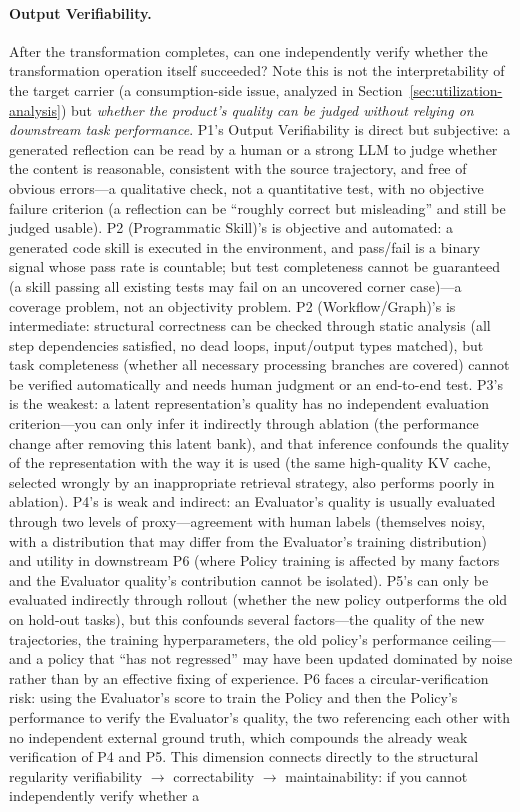 \paragraph{Output Verifiability.} After the transformation completes, can one independently verify whether the transformation operation itself succeeded? Note this is not the interpretability of the target carrier (a consumption-side issue, analyzed in Section~\ref{sec:utilization-analysis}) but \emph{whether the product's quality can be judged without relying on downstream task performance}. P1's Output Verifiability is direct but subjective: a generated reflection can be read by a human or a strong LLM to judge whether the content is reasonable, consistent with the source trajectory, and free of obvious errors---a qualitative check, not a quantitative test, with no objective failure criterion (a reflection can be ``roughly correct but misleading'' and still be judged usable). P2 (Programmatic Skill)'s is objective and automated: a generated code skill is executed in the environment, and pass/fail is a binary signal whose pass rate is countable; but test completeness cannot be guaranteed (a skill passing all existing tests may fail on an uncovered corner case)---a coverage problem, not an objectivity problem. P2 (Workflow/Graph)'s is intermediate: structural correctness can be checked through static analysis (all step dependencies satisfied, no dead loops, input/output types matched), but task completeness (whether all necessary processing branches are covered) cannot be verified automatically and needs human judgment or an end-to-end test. P3's is the weakest: a latent representation's quality has no independent evaluation criterion---you can only infer it indirectly through ablation (the performance change after removing this latent bank), and that inference confounds the quality of the representation with the way it is used (the same high-quality KV cache, selected wrongly by an inappropriate retrieval strategy, also performs poorly in ablation). P4's is weak and indirect: an Evaluator's quality is usually evaluated through two levels of proxy---agreement with human labels (themselves noisy, with a distribution that may differ from the Evaluator's training distribution) and utility in downstream P6 (where Policy training is affected by many factors and the Evaluator quality's contribution cannot be isolated). P5's can only be evaluated indirectly through rollout (whether the new policy outperforms the old on hold-out tasks), but this confounds several factors---the quality of the new trajectories, the training hyperparameters, the old policy's performance ceiling---and a policy that ``has not regressed'' may have been updated dominated by noise rather than by an effective fixing of experience. P6 faces a circular-verification risk: using the Evaluator's score to train the Policy and then the Policy's performance to verify the Evaluator's quality, the two referencing each other with no independent external ground truth, which compounds the already weak verification of P4 and P5. This dimension connects directly to the structural regularity verifiability $\rightarrow$ correctability $\rightarrow$ maintainability: if you cannot independently verify whether a 